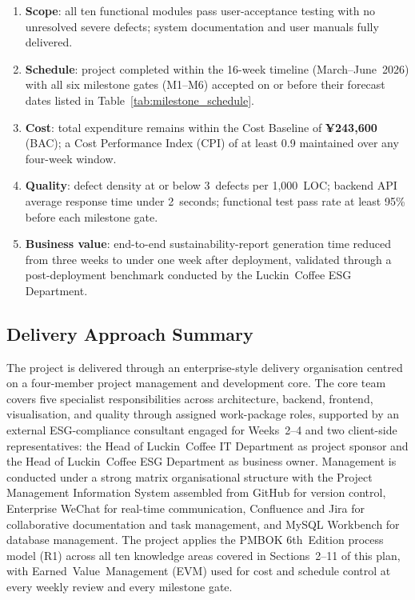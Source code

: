 \documentclass[12pt,a4paper]{article}
\begin{document}
\begin{enumerate}[leftmargin=*,itemsep=2pt]
    \item \textbf{Scope}: all ten functional modules pass user-acceptance testing with no unresolved severe defects; system documentation and user manuals fully delivered.
    \item \textbf{Schedule}: project completed within the 16-week timeline (March--June~2026) with all six milestone gates (M1--M6) accepted on or before their forecast dates listed in Table~\ref{tab:milestone_schedule}.
    \item \textbf{Cost}: total expenditure remains within the Cost Baseline of \textbf{¥243{,}600} (BAC); a Cost Performance Index (CPI) of at least 0.9 maintained over any four-week window.
    \item \textbf{Quality}: defect density at or below 3~defects per 1{,}000~LOC; backend API average response time under 2~seconds; functional test pass rate at least 95\% before each milestone gate.
    \item \textbf{Business value}: end-to-end sustainability-report generation time reduced from three weeks to under one week after deployment, validated through a post-deployment benchmark conducted by the Luckin~Coffee ESG Department.
\end{enumerate}

\subsection*{Delivery Approach Summary}

The project is delivered through an enterprise-style delivery organisation centred on a four-member project management and development core. The core team covers five specialist responsibilities across architecture, backend, frontend, visualisation, and quality through assigned work-package roles, supported by an external ESG-compliance consultant engaged for Weeks~2--4 and two client-side representatives: the Head of Luckin~Coffee IT Department as project sponsor and the Head of Luckin~Coffee ESG Department as business owner. Management is conducted under a strong matrix organisational structure with the Project Management Information System assembled from GitHub for version control, Enterprise WeChat for real-time communication, Confluence and Jira for collaborative documentation and task management, and MySQL Workbench for database management. The project applies the PMBOK 6th~Edition process model (R1) across all ten knowledge areas covered in Sections~2--11 of this plan, with Earned~Value~Management (EVM) used for cost and schedule control at every weekly review and every milestone gate.
\end{document}
